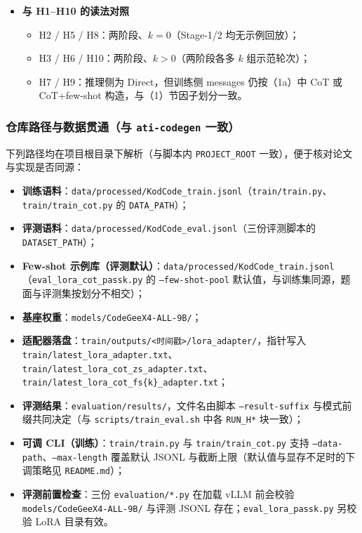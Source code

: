 \begin{itemize}
\begin{itemize}
        \item \textbf{字面模板}：上述 Stage-1 / Stage-2 与 CoT-FS 示例骨架的逐字模板见附录~\ref{appendix:prompts}~A.2.2、A.2.3。
    \end{itemize}
    \item \textbf{与 H1--H10 的读法对照}
    \begin{itemize}
        \item H2 / H5 / H8：两阶段、$k{=}0$（Stage-1/2 均无示例回放）；
        \item H3 / H6 / H10：两阶段、$k{>}0$（两阶段各多 $k$ 组示范轮次）；
        \item H7 / H9：推理侧为 Direct，但训练侧 messages 仍按（1a）中 CoT 或 CoT+few-shot 构造，与（1）节因子划分一致。
    \end{itemize}
\end{itemize}

\subsubsection{仓库路径与数据贯通（与 \texttt{ati-codegen} 一致）}
下列路径均在项目根目录下解析（与脚本内 \texttt{PROJECT\_ROOT} 一致），便于核对论文与实现是否同源：
\begin{itemize}
    \item \textbf{训练语料}：\texttt{data/processed/KodCode\_train.jsonl}（\texttt{train/train.py}、\texttt{train/train\_cot.py} 的 \texttt{DATA\_PATH}）；
    \item \textbf{评测语料}：\texttt{data/processed/KodCode\_eval.jsonl}（三份评测脚本的 \texttt{DATASET\_PATH}）；
    \item \textbf{Few-shot 示例库（评测默认）}：\texttt{data/processed/KodCode\_train.jsonl}（\texttt{eval\_lora\_cot\_passk.py} 的 \texttt{--few-shot-pool} 默认值，与训练集同源，题面与评测集按划分不相交）；
    \item \textbf{基座权重}：\texttt{models/CodeGeeX4-ALL-9B/}；
    \item \textbf{适配器落盘}：\texttt{train/outputs/<时间戳>/lora\_adapter/}，指针写入 \texttt{train/latest\_lora\_adapter.txt}、\texttt{train/latest\_lora\_cot\_\allowbreak zs\_adapter.txt}、\texttt{train/latest\_lora\_cot\_fs\{k\}\_adapter.txt}；
    \item \textbf{评测结果}：\texttt{evaluation/results/}，文件名由脚本 \texttt{--result-suffix} 与模式前缀共同决定（与 \texttt{scripts/train\_eval.sh} 中各 \texttt{RUN\_H*} 块一致）；
    \item \textbf{可调 CLI（训练）}：\texttt{train/train.py} 与 \texttt{train/train\_cot.py} 支持 \texttt{--data-path}、\texttt{--max-length} 覆盖默认 JSONL 与截断上限（默认值与显存不足时的下调策略见 \texttt{README.md}）；
    \item \textbf{评测前置检查}：三份 \texttt{evaluation/*.py} 在加载 vLLM 前会校验 \texttt{models/\allowbreak CodeGeeX4-ALL-9B/} 与评测 JSONL 存在；\texttt{eval\_lora\_passk.py} 另校验 LoRA 目录有效。
\end{itemize}

